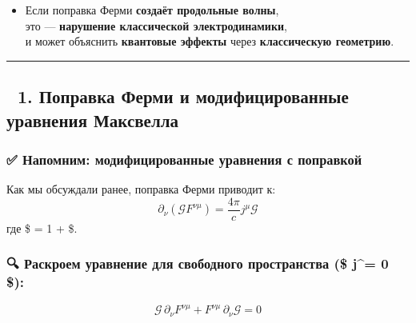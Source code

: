 \documentclass[11pt]{article}
\providecommand{\tightlist}{%
      \setlength{\itemsep}{0pt}\setlength{\parskip}{0pt}}
\begin{document}
\begin{itemize}
\tightlist
\item
  Если поправка Ферми \textbf{создаёт продольные волны},\\
  это --- \textbf{нарушение классической электродинамики},\\
  и может объяснить \textbf{квантовые эффекты} через
  \textbf{классическую геометрию}.
\end{itemize}

\begin{center}\rule{0.5\linewidth}{\linethickness}\end{center}

\subsection{🔹 1. Поправка Ферми и модифицированные уравнения
Максвелла}\label{ux43fux43eux43fux440ux430ux432ux43aux430-ux444ux435ux440ux43cux438-ux438-ux43cux43eux434ux438ux444ux438ux446ux438ux440ux43eux432ux430ux43dux43dux44bux435-ux443ux440ux430ux432ux43dux435ux43dux438ux44f-ux43cux430ux43aux441ux432ux435ux43bux43bux430}

\subsubsection{✅ Напомним: модифицированные уравнения с
поправкой}\label{ux43dux430ux43fux43eux43cux43dux438ux43c-ux43cux43eux434ux438ux444ux438ux446ux438ux440ux43eux432ux430ux43dux43dux44bux435-ux443ux440ux430ux432ux43dux435ux43dux438ux44f-ux441-ux43fux43eux43fux440ux430ux432ux43aux43eux439}

Как мы обсуждали ранее, поправка Ферми приводит к: \[
\boxed{
\partial_\nu \left( \mathcal{G} F^{\nu\mu} \right) = \frac{4\pi}{c} j^\mu \mathcal{G}
}
\] где \$  = 1 +
 \$.

\subsubsection{\texorpdfstring{🔍 Раскроем уравнение для свободного
пространства (\$ j\^{}\mu = 0
\$):}{🔍 Раскроем уравнение для свободного пространства (\$ j\^{}= 0 \$):}}\label{ux440ux430ux441ux43aux440ux43eux435ux43c-ux443ux440ux430ux432ux43dux435ux43dux438ux435-ux434ux43bux44f-ux441ux432ux43eux431ux43eux434ux43dux43eux433ux43e-ux43fux440ux43eux441ux442ux440ux430ux43dux441ux442ux432ux430-j-0}

\[
\mathcal{G} \, \partial_\nu F^{\nu\mu} + F^{\nu\mu} \, \partial_\nu \mathcal{G} = 0
\]
\end{document}
